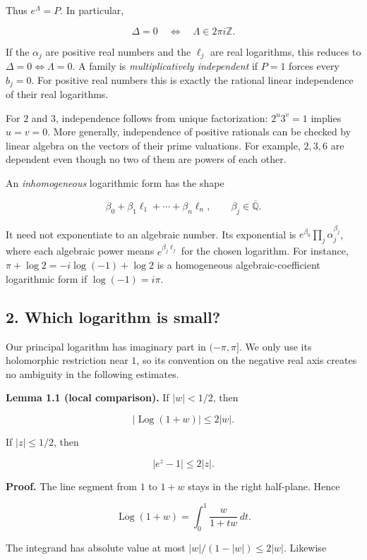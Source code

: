 \documentclass[
  11pt,
  a4paper,
]{article}
\begin{document}
Thus \(e^\Lambda=P\). In particular,

\[
\Delta=0\quad\Longleftrightarrow\quad\Lambda\in2\pi i\mathbb Z.
\]

If the \(\alpha_j\) are positive real numbers and the \(\ell_j\) are
real logarithms, this reduces to
\(\Delta=0\Longleftrightarrow\Lambda=0\). A family is
\emph{multiplicatively independent} if \(P=1\) forces every \(b_j=0\).
For positive real numbers this is exactly the rational linear
independence of their real logarithms.

For \(2\) and \(3\), independence follows from unique factorization:
\(2^u3^v=1\) implies \(u=v=0\). More generally, independence of positive
rationals can be checked by linear algebra on the vectors of their prime
valuations. For example, \(2,3,6\) are dependent even though no two of
them are powers of each other.

An \emph{inhomogeneous} logarithmic form has the shape

\[
\beta_0+\beta_1\ell_1+\cdots+\beta_n\ell_n,
\qquad \beta_j\in\overline{\mathbb Q}.
\]

It need not exponentiate to an algebraic number. Its exponential is
\(e^{\beta_0}\prod_j\alpha_j^{\beta_j}\), where each algebraic power
means \(e^{\beta_j\ell_j}\) for the chosen logarithm. For instance,
\(\pi+\log 2=-i\log(-1)+\log2\) is a homogeneous algebraic-coefficient
logarithmic form if \(\log(-1)=i\pi\).

\subsection{2. Which logarithm is
small?}\label{which-logarithm-is-small}

Our principal logarithm has imaginary part in \((-\pi,\pi]\). We only
use its holomorphic restriction near \(1\), so its convention on the
negative real axis creates no ambiguity in the following estimates.

\textbf{Lemma 1.1 (local comparison).} If \(|w|<1/2\), then

\[
|\operatorname{Log}(1+w)|\le2|w|.
\]

If \(|z|\le1/2\), then

\[
|e^z-1|\le2|z|.
\]

\textbf{Proof.} The line segment from \(1\) to \(1+w\) stays in the
right half-plane. Hence

\[
\operatorname{Log}(1+w)=\int_0^1\frac{w}{1+tw}\,dt.
\]

The integrand has absolute value at most \(|w|/(1-|w|)\le2|w|\).
Likewise
\end{document}
